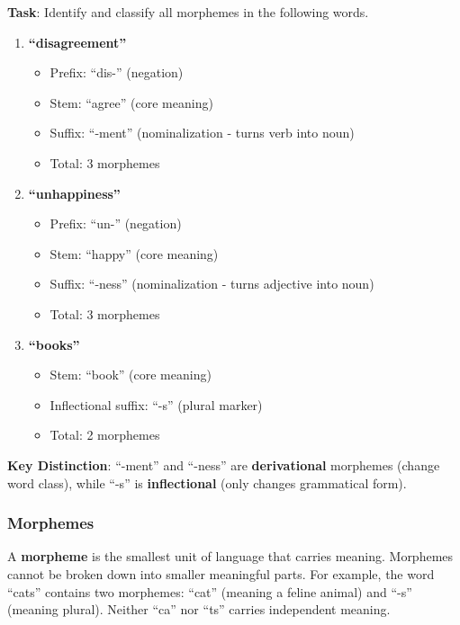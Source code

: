 \documentclass[11pt,a4paper]{article}
\begin{document}
\begin{tcolorbox}[colback=green!5!white,colframe=green!75!black,title=\textbf{Worked Example: Morpheme Identification}]
\textbf{Task}: Identify and classify all morphemes in the following words.

\begin{enumerate}
    \item \textbf{``disagreement''}
    \begin{itemize}
        \item Prefix: ``dis-'' (negation)
        \item Stem: ``agree'' (core meaning)
        \item Suffix: ``-ment'' (nominalization - turns verb into noun)
        \item Total: 3 morphemes
    \end{itemize}
    
    \item \textbf{``unhappiness''}
    \begin{itemize}
        \item Prefix: ``un-'' (negation)
        \item Stem: ``happy'' (core meaning)
        \item Suffix: ``-ness'' (nominalization - turns adjective into noun)
        \item Total: 3 morphemes
    \end{itemize}
    
    \item \textbf{``books''}
    \begin{itemize}
        \item Stem: ``book'' (core meaning)
        \item Inflectional suffix: ``-s'' (plural marker)
        \item Total: 2 morphemes
    \end{itemize}
\end{enumerate}

\textbf{Key Distinction}: ``-ment'' and ``-ness'' are \textbf{derivational} morphemes (change word class), while ``-s'' is \textbf{inflectional} (only changes grammatical form).
\end{tcolorbox}

\subsubsection{Morphemes}

A \textbf{morpheme} is the smallest unit of language that carries meaning. Morphemes cannot be broken down into smaller meaningful parts. For example, the word ``cats'' contains two morphemes: ``cat'' (meaning a feline animal) and ``-s'' (meaning plural). Neither ``ca'' nor ``ts'' carries independent meaning.
\end{document}
